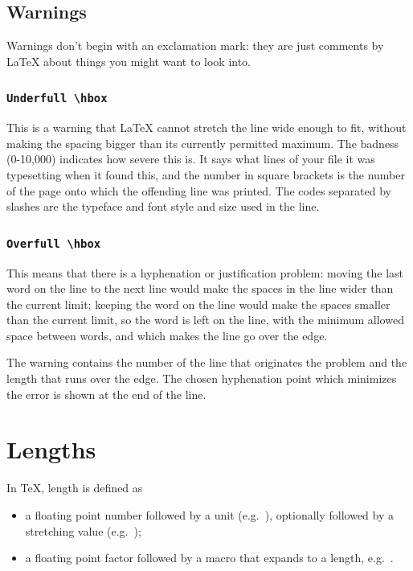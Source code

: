 \documentclass[a4paper,oneside]{book}
\newcommand{\syntax}[1]{\PVerb{#1}}
\begin{document}
\section{Warnings}
Warnings don't begin with an exclamation mark: they are just comments by \LaTeX{} about things you might want to look into.
\subsection{\texttt{Underfull \textbackslash hbox}}
This is a warning that \LaTeX{} cannot stretch the line wide enough to fit, without making the spacing bigger than its currently permitted maximum.
The badness (0-10,000) indicates how severe this is. It says what lines of your file it was typesetting when it found this, and the number in square brackets is the number of the page onto which the offending line was printed. The codes separated by slashes are the typeface and font style and size used in the line. 
\subsection{\texttt{Overfull \textbackslash hbox}}
This means that there is a hyphenation or justification problem: moving the last word on the line to the next line would make the spaces in the line wider than the current limit; keeping the word on the line would make the spaces smaller than the current limit, so the word is left on the line, with the minimum allowed space between words, and which makes the line go over the edge.

The warning contains the number of the line that originates the problem and the length that runs over the edge.
The chosen hyphenation point which minimizes the error is shown at the end of the line.

\chapter{Lengths}
In \TeX{}, length is defined as
\begin{itemize}
  \item a floating point number followed by a unit (e.g.\ \syntax{3.5pt}), optionally followed by a stretching value (e.g.\ \syntax{plus 1pt minus 2pt});
  \item a floating point factor followed by a macro that expands to a length, e.g.\ \syntax{3.5\textwidth}.
\end{itemize}
\end{document}
